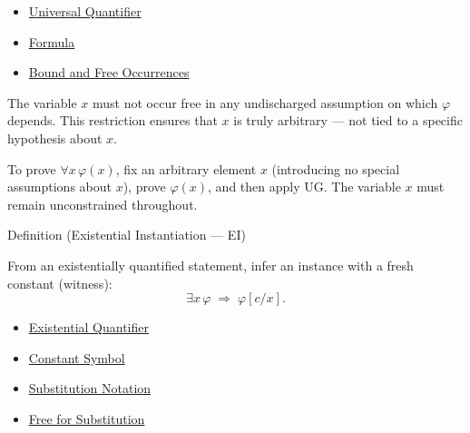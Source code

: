 \begin{dependencies}
\begin{itemize}
  \item \hyperref[def:universal-q]{Universal Quantifier}
  \item \hyperref[def:formula]{Formula}
  \item \hyperref[def:bound-free]{Bound and Free Occurrences}
\end{itemize}
\end{dependencies}

\begin{remark*}[Restriction on UG]
The variable $x$ must not occur free in any undischarged assumption on which
$\varphi$ depends. This restriction ensures that $x$ is truly arbitrary ---
not tied to a specific hypothesis about $x$.
\end{remark*}

\begin{remark*}
To prove $\forall x\,\varphi(x)$, fix an arbitrary element $x$ (introducing no
special assumptions about $x$), prove $\varphi(x)$, and then apply UG. The
variable $x$ must remain unconstrained throughout.
\end{remark*}

\begin{definitionbox}{Definition (Existential Instantiation --- EI)}
\begin{definition}\label{def:ei}
From an existentially quantified statement, infer an instance with a fresh
constant (witness):
\[
\exists x\,\varphi \;\Rightarrow\; \varphi[c/x].
\]
\end{definition}
\end{definitionbox}

\begin{dependencies}
\begin{itemize}
  \item \hyperref[def:existential-q]{Existential Quantifier}
  \item \hyperref[def:constant-symbol]{Constant Symbol}
  \item \hyperref[def:subst-notation]{Substitution Notation}
  \item \hyperref[def:free-for]{Free for Substitution}
\end{itemize}
\end{dependencies}


